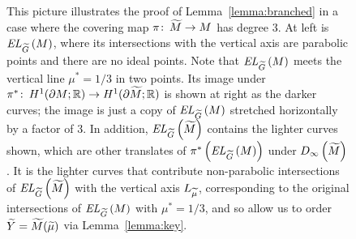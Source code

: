 \documentclass[tikz, sepfignums, defaultenums]{nmd/article}
\newcommand{\TEL}[1]{\mathit{EL}_\Gtil\left(#1\right)}
\newcommand{\SymTEL}[1]{D_\infty\left(#1\right)}
\begin{document}
\begin{figure}
  \begin{center}
    
  \end{center}
  \caption{This picture illustrates the proof of
    Lemma~\ref{lemma:branched} in a case where the covering map
    $\pi \maps \Mtil \to M$ has degree 3.  At left is $\TEL{M}$, where
    its intersections with the vertical axis are parabolic points and
    there are no ideal points.  Note that $\TEL{M}$ meets the
    vertical line $\mu^* = 1/3$ in two points. Its image under
    $\pi^* \maps H^1(\partial M; \R) \to H^1(\partial \Mtil; \R)$ is
    shown at right as the darker curves; the image is just a copy of
    $\TEL{M}$ stretched horizontally by a factor of 3.  In addition,
    $\TEL{\Mtil}$ contains the lighter curves shown, which are other
    translates of $\pi^*\left(\TEL{M}\right)$ under $\SymTEL{\Mtil}$.
    It is the lighter curves that contribute non-parabolic
    intersections of $\TEL{\Mtil}$ with the vertical axis $L_\mutil$,
    corresponding to the original intersections of $\TEL{M}$ with
    $\mu^* = 1/3$, and so allow us to order $\Ytil = \Mtil(\mutil)$
    via Lemma~\ref{lemma:key}.  }
  \label{fig:branched}
\end{figure}
\end{document}
